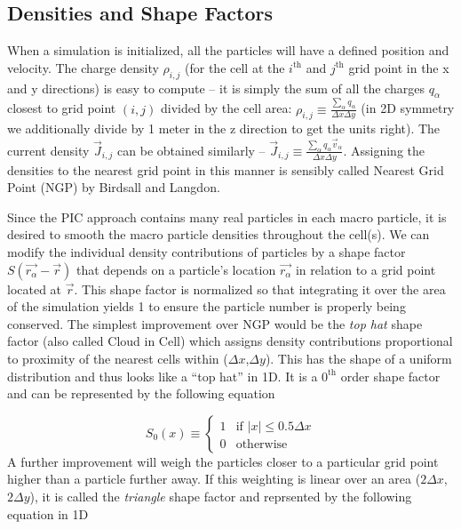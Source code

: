 \subsection{Densities and Shape Factors}

When a simulation is initialized, all the particles will have a defined position and velocity. The charge density $\rho_{i,j}$ (for the cell at the $i^\text{th}$ and $j^\text{th}$ grid point in the x and y directions) is easy to compute -- it is simply the sum of all the charges $q_\alpha$ closest to grid point $(i,j)$ divided by the cell area: $\rho_{i,j} \equiv \frac{\sum_\alpha q_\alpha}{\Delta x \Delta y}$ (in 2D symmetry we additionally divide by 1 meter in the z direction to get the units right). The current density $\vec{J}_{i,j}$ can be obtained similarly -- $\vec{J}_{i,j} \equiv \frac{\sum_\alpha q_\alpha \vec{v}_\alpha}{\Delta x \Delta y}$. Assigning the densities to the nearest grid point in this manner is sensibly called Nearest Grid Point (NGP) by Birdsall and Langdon\cite{Birdsall_2004_PIC}.

Since the PIC approach contains many real particles in each macro particle, it is desired to smooth the macro particle densities throughout the cell(s). We can modify the individual density contributions of particles by a shape factor $S(\vec{r_\alpha} - \vec{r})$ that depends on a particle's location $\vec{r_\alpha}$ in relation to a grid point located at $\vec{r}$. This shape factor is normalized so that integrating it over the area of the simulation yields 1 to ensure the particle number is properly being conserved. The simplest improvement over NGP would be the \emph{top hat} shape factor (also called Cloud in Cell\cite{Birdsall_2004_PIC}) which assigns density contributions proportional to proximity of the nearest cells within ($\Delta x$,$\Delta y$). This has the shape of a uniform distribution and thus looks like a ``top hat'' in 1D. It is a $0^\text{th}$ order shape factor and can be represented by the following equation

\begin{equation}
	S_0(x) \equiv \begin{cases}
		1 & \text{if } \lvert x \rvert \leq 0.5 \Delta x \\
		0 & \text{otherwise}
	\end{cases} \label{eq:tophat}
\end{equation}
A further improvement will weigh the particles closer to a particular grid point higher than a particle further away. If this weighting is linear over an area ($2 \Delta x$, $2 \Delta y$), it is called the \emph{triangle} shape factor and reprsented by the following equation in 1D

